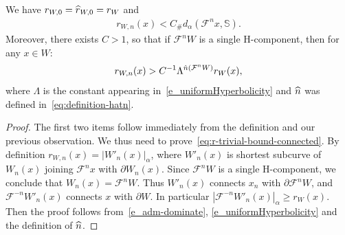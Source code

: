 \documentclass[AHL, Unicode, longabstracts,published]{cedram}
\newcommand{\const}{C_\#}
\newcommand{\inv}{^{-1}}
\newcommand{\hhs}{\mathbb{S}}
\newcommand{\cm}{\mathcal{F}}
\newcommand{\dadm}[1]{\dadmPrivate^{#1}}
\newcommand{\dadmPrivate}{d\adm}
\newcommand{\adm}{_{\alpha^{+}}}
\renewcommand{\adm}{_{\alpha}}
\renewcommand{\dadm}{d\adm}
\let\oldhat\hat
\renewcommand*{\hat}[1]{\mathchoice{\widehat{#1}}{\widehat{#1}}{\oldhat{#1}}{\oldhat{#1}}}
\begin{document}
\begin{lemm}
We have $r_{W,0} = \hat r_{W,0} = r_{W}$ and
\begin{align}\label{eq:silly-bound-on-r}
r_{W,n}(x) < \const \dadm(\cm^{n}x,\hhs).
\end{align}
Moreover, there exists $C > 1$, so that if $\cm^{n}W$ is a single H-component, then for any $x\in W$:
\begin{align}\label{eq:r-trivial-bound-connected}
r_{W,n}(x) > C\inv\Lambda^{\hat n(\cm^{n}W)} r_{W}(x),
\end{align}
where $\Lambda$ is the constant appearing in~\eqref{e_uniformHyperbolicity} and $\hat n$ was defined in~\eqref{eq:definition-hatn}.
\end{lemm}
\begin{proof}
The first two items follow immediately from the definition and our previous observation. We thus need to prove~\eqref{eq:r-trivial-bound-connected}. By definition $r_{W,n}(x) = |W'_{n}(x)|\adm$, where $W'_{n}(x)$ is shortest subcurve of $W_{n}(x)$ joining $\cm^{n}x$ with $\partial W_{n}(x)$. Since $\cm^{n}W$ is a single H-component, we conclude that $W_{n}(x) = \cm^{n}W$. Thus $W'_{n}(x)$ connects $x_{n}$ with $\partial \cm^{n}W$, and $\cm^{-n}W'_{n}(x)$ connects $x$ with $\partial W$. In particular $|\cm^{-n}W'_{n}(x)|\adm\ge r_{W}(x)$. Then the proof follows from~\eqref{e_adm-dominate}, \eqref{e_uniformHyperbolicity} and the definition of $\hat n$.
\end{proof}
\end{document}
